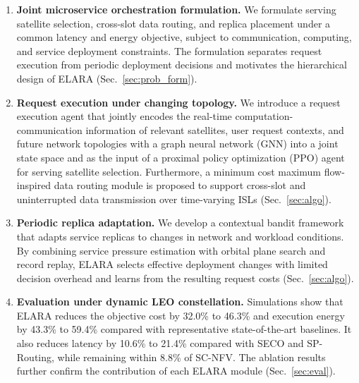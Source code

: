 \documentclass[10pt, conference, letterpaper]{IEEEtran}
\begin{document}
\begin{enumerate}
\item \textbf{Joint microservice orchestration formulation.}
We formulate serving satellite selection, cross-slot data routing, and replica placement under a common latency and energy objective, subject to communication, computing, and service deployment constraints. The formulation separates request execution from periodic deployment decisions and motivates the hierarchical design of ELARA (Sec.~\ref{sec:prob_form}).

\item \textbf{Request execution under changing topology.}
We introduce a request execution agent that jointly encodes the real-time computation-communication information of relevant satellites, user request contexts, and future network topologies with a graph neural network (GNN) into a joint state space and as the input of a proximal policy optimization (PPO) agent for serving satellite selection. Furthermore, a minimum cost maximum flow-inspired data routing module is proposed to support cross-slot and uninterrupted data transmission over time-varying ISLs (Sec.~\ref{sec:algo}).

\item \textbf{Periodic replica adaptation.}
We develop a contextual bandit framework that adapts service replicas to changes in network and workload conditions. By combining service pressure estimation with orbital plane search and record replay, ELARA selects effective deployment changes with limited decision overhead and learns from the resulting request costs (Sec.~\ref{sec:algo}).

\item \textbf{Evaluation under dynamic LEO constellation.}
Simulations show that ELARA reduces the objective cost by 32.0\% to 46.3\% and execution energy by 43.3\% to 59.4\% compared with representative state-of-the-art baselines. It also reduces latency by 10.6\% to 21.4\% compared with SECO and SP-Routing, while remaining within 8.8\% of SC-NFV. The ablation results further confirm the contribution of each ELARA module (Sec.~\ref{sec:eval}).
\end{enumerate}
\end{document}
